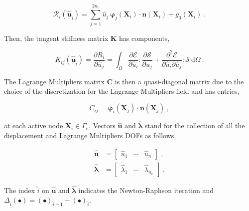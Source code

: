 \documentclass[10pt,a4paper]{article}
\begin{document}
\begin{equation}
	\mathcal{R}_i ( \hat{\mathbf{u}}_{\hat{i}} ) = \sum_{j = 1}^{2 n_{\text{c}}} \hat{u}_j \, \boldsymbol{\varphi}_j (\mathbf{X}_i) \cdot \mathbf{n}(\mathbf{X}_i) + g_0(\mathbf{X}_i) \;.
\end{equation}

Then, the tangent stiffness matrix $\mathbf{K}$ has components,

\begin{equation}
	K_{ij} ( \hat{\mathbf{u}}_{\hat{i}} ) = \frac{\partial R_i}{\partial \hat{u}_j} = \int_{\Omega} \frac{\partial \boldsymbol{\mathcal{E}}}{\partial \hat{u}_i} : \frac{\partial \boldsymbol{\mathcal{S}}}{\partial \hat{u}_j} + \frac{\partial^2 \boldsymbol{\mathcal{E}}}{\partial \hat{u}_i \partial \hat{u}_j} : \boldsymbol{\mathcal{S}} \: \text{d} \Omega \:. \label{eq:tangent_stiffness_matrix}
\end{equation}

The Lagrange Multipliers matrix $\mathbf{C}$ is then a quasi-diagonal matrix due to the choice of the discretization for the Lagrange Multipliers field and has entries,

\begin{equation}
	C_{ij} =  \boldsymbol{\varphi}_i (\mathbf{X}_j) \cdot \mathbf{n}(\mathbf{X}_j) \:,	\label{eq:lagrange_multipliers_matrix}
\end{equation}

at each active node $\mathbf{X}_i \in \Gamma_{\text{c}}$. Vectors $\hat{\mathbf{u}}$ and $\hat{\boldsymbol{\lambda}}$ stand for the collection of all the displacement and Lagrange Multipliers DOFs as follows,

\begin{subequations}
	\begin{alignat}{1}
		\hat{\mathbf{u}} &= \left[ \begin{array}{ccc} \hat{u}_1 & \cdots & \hat{u}_n \end{array} \right] \;, \label{eq:vector_of_displacement_dofs} \\
		\boldsymbol{\hat{\boldsymbol{\lambda}}} &= \left[ \begin{array}{ccc} \hat{\lambda}_1 & \cdots & \hat{\lambda}_{n_{\text{c}}} \end{array} \right] \;. \label{eq:vector_of_lagrange_multipliers_dofs}
	\end{alignat}
	\label{eq:vectors_of_dofs}
\end{subequations}

The index $\hat{i}$ on $\hat{\mathbf{u}}$ and $\hat{\boldsymbol{\lambda}}$ indicates the Newton-Raphson iteration and $\Delta_{\hat{i}} (\bullet) = (\bullet)_{\hat{i} + 1} - (\bullet)_{\hat{i}}$.
\end{document}

